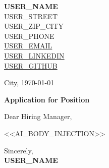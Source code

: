 \documentclass[11pt,a4paper]{article}
\begin{document}
\pagestyle{empty}

\begin{flushright}
  \textbf{{{USER_NAME}}}\\[2pt]
  {{USER_STREET}}\\
  {{USER_ZIP_CITY}}\\[2pt]
  {{USER_PHONE}}\\
  \href{mailto:{{USER_EMAIL}}}{{{USER_EMAIL}}}\\
  \href{https://{{USER_LINKEDIN}}}{{{USER_LINKEDIN}}}\\
  \href{https://{{USER_GITHUB}}}{{{USER_GITHUB}}}
\end{flushright}
\vspace{20pt}

\begin{flushright}
City, \today
\end{flushright}
\vspace{10pt}

\textbf{Application for Position}

\vspace{10pt}

Dear Hiring Manager,

<<AI_BODY_INJECTION>>

Sincerely,\\[20pt]

\textbf{{{USER_NAME}}}
\end{document}
